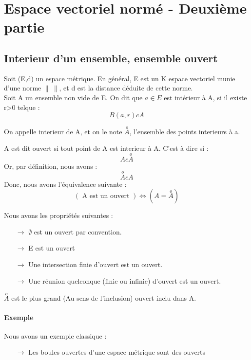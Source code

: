 \chapter{Espace vectoriel normé - Deuxième partie}
\section{Interieur d'un ensemble, ensemble ouvert}
\begin{de}
Soit (E,d) un espace métrique. En général, E est un K espace vectoriel munie d'une norme $\parallel~\parallel$, et d est la distance déduite de cette norme.\\
Soit A un ensemble non vide de E. On dit que $a \in E$ est intérieur à A, si il existe r>0 telque :
$$B(a,r) c A$$
\end{de}
\begin{de}
On appelle interieur de A, et on le note $\overset{o}A$, l'ensemble des points interieurs à a.
\end{de}
\begin{de}
A est dit ouvert si tout point de A est interieur à A. C'est à dire si :
$$A c \overset{o}A$$
Or, par définition, nous avons : 
$$\overset{o}A c A$$
Donc, nous avons l'équivalence suivante : 
$$(\mbox{ A est un ouvert }) \Leftrightarrow (A = \overset{o}A)$$
\end{de}
\begin{prop}
Nous avons les propriétés suivantes : 
\begin{itemize}
 \item[$\rightarrow$] $\emptyset$ est un ouvert par convention.
 \item[$\rightarrow$] E est un ouvert
 \item[$\rightarrow$] Une intersection finie d'ouvert est un ouvert.
 \item[$\rightarrow$] Une réunion quelconque (finie ou infinie) d'ouvert est un ouvert.
\end{itemize}
\end{prop}
\begin{prop}
$\overset{o}A$ est le plus grand (Au sens de l'inclusion) ouvert inclu dans A.
\end{prop}
\subsubsection{Exemple}
Nous avons un exemple classique : 
\begin{itemize}
 \item[$\rightarrow$] Les boules ouvertes d'une espace métrique sont des ouverts
\end{itemize}

